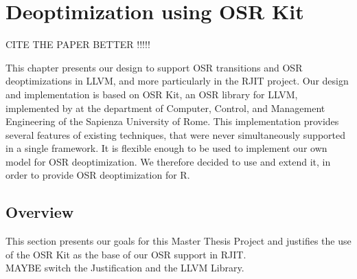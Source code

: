
\chapter{Deoptimization using OSR Kit} %

\label{Chapter4} %


\newcommand{\keyword}[1]{\textbf{#1}}
\newcommand{\tabhead}[1]{\textbf{#1}}
\newcommand{\code}[1]{\texttt{#1}}
\newcommand{\file}[1]{\texttt{\bfseries#1}}
\newcommand{\option}[1]{\texttt{\itshape#1}}

CITE THE PAPER BETTER !!!!!

This chapter presents our design to support OSR transitions and OSR deoptimizations in LLVM, and more particularly in the RJIT project.
Our design and implementation is based on OSR Kit\cite{OSRKit, OSRKitGit}, an OSR library for LLVM, implemented by  at the department of Computer, Control, and Management Engineering of the Sapienza University of Rome.
This implementation provides several features of existing techniques, that were never simultaneously supported in a single framework.
It is flexible enough to be used to implement our own model for OSR deoptimization.
We therefore decided to use and extend it, in order to provide OSR deoptimization for R.\\

\section{Overview}
This section presents our goals for this Master Thesis Project and justifies the use of the OSR Kit as the base of our OSR support in RJIT.\\

MAYBE switch the Justification and the LLVM Library.\\

